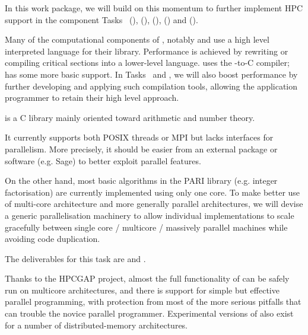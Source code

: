 \begin{workpackage}
\begin{wpdescription}
  In this work package, we will build on this momentum to further implement HPC support in
  the component Tasks~ (\Pari), (\GAP),
   (\Linbox), (\MPIR) and
   (\Singular).
  
  Many of the computational components of \TheProject, notably \Sage
  and \GAP use a high level
  interpreted language for their library. Performance is achieved by
  rewriting or compiling critical sections into a lower-level
  language. \Sage uses
  the \Cython \Python-to-C compiler; \GAP has some more basic support.
  In Tasks~ and , we will also boost performance by
  further developing and applying such compilation tools, allowing the
  application programmer to retain their high level approach.

\end{wpdescription}
\begin{tasklist}
\begin{task}[title=PARI,id=hpc-pari,PM=20, lead=UB,wphases=0-48!0.5,issue=99]
  \Pari is a C library mainly oriented toward arithmetic and number theory.
  
  It currently supports both POSIX threads or MPI but lacks interfaces for
  parallelism. More precisely, it should be easier from an external package
  or software (e.g. Sage) to better exploit \Pari parallel features.

  On the other hand, most basic algorithms in the PARI library (e.g. integer
  factorisation) are currently implemented using only one core. To
  make better use of multi-core architecture and more generally parallel
  architectures, we will devise a generic parallelisation machinery
  to allow individual implementations to scale gracefully between single
  core / multicore / massively parallel machines while avoiding code
  duplication.

  The deliverables for this task are 
  and .
\end{task}


\begin{task}[title=GAP,id=hpc-gap,PM=18, lead=SA, wphases={0-48!0.375}, issue=100]
  Thanks to the HPCGAP project, almost the full functionality of \GAP
  can be safely run on multicore architectures, and there is support for
  simple but effective parallel programming, with protection from most
  of the more serious pitfalls that can trouble the novice parallel
  programmer. Experimental versions of \GAP also exist for a number of
  distributed-memory architectures.



\end{task}
\end{tasklist}
\end{workpackage}
